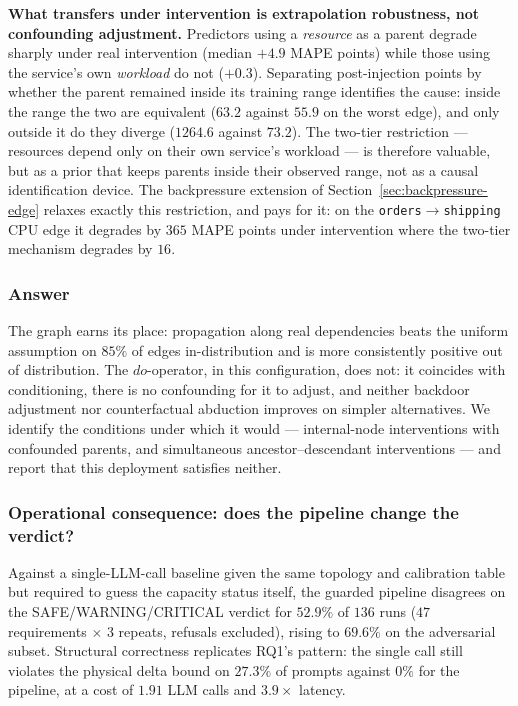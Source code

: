\documentclass[journal, 10pt]{IEEEtran}
\begin{document}
\textbf{What transfers under intervention is extrapolation robustness, not
confounding adjustment.} Predictors using a \emph{resource} as a parent degrade
sharply under real intervention (median $+4.9$ MAPE points) while those using the
service's own \emph{workload} do not ($+0.3$). Separating post-injection points
by whether the parent remained inside its training range identifies the cause:
inside the range the two are equivalent ($63.2$ against $55.9$ on the worst
edge), and only outside it do they diverge ($1264.6$ against $73.2$). The
two-tier restriction --- resources depend only on their own service's workload
--- is therefore valuable, but as a prior that keeps parents inside their
observed range, not as a causal identification device. The backpressure extension
of Section~\ref{sec:backpressure-edge} relaxes exactly this restriction, and pays
for it: on the \texttt{orders}$\to$\texttt{shipping} CPU edge it degrades by
$365$ MAPE points under intervention where the two-tier mechanism degrades by
$16$.

\subsubsection{Answer}
The graph earns its place: propagation along real dependencies beats the uniform
assumption on $85\%$ of edges in-distribution and is more consistently positive
out of distribution. The $do$-operator, in this configuration, does not: it
coincides with conditioning, there is no confounding for it to adjust, and
neither backdoor adjustment nor counterfactual abduction improves on simpler
alternatives. We identify the conditions under which it would --- internal-node
interventions with confounded parents, and simultaneous ancestor--descendant
interventions --- and report that this deployment satisfies neither.


\subsubsection{Operational consequence: does the pipeline change the verdict?}
\label{sec:rq1-operational}
\label{sec:operational}
Against a single-LLM-call baseline given the same topology and calibration table
but required to guess the capacity status itself, the guarded pipeline disagrees
on the SAFE/WARNING/CRITICAL verdict for $52.9\%$ of $136$ runs ($47$
requirements $\times$ 3 repeats, refusals excluded), rising to $69.6\%$ on the
adversarial subset. Structural correctness replicates RQ1's pattern: the single
call still violates the physical delta bound on $27.3\%$ of prompts against
$0\%$ for the pipeline, at a cost of $1.91$ LLM calls and $3.9{\times}$ latency.
\end{document}
